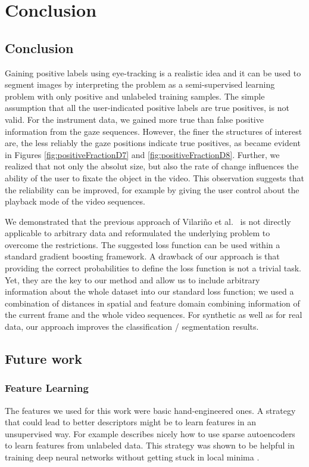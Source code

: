 \chapter{Conclusion}
\label{chap:conclusion}
\section{Conclusion}
Gaining positive labels using eye-tracking is a realistic idea and it can be used to segment images by interpreting the problem as a semi-supervised learning problem with only positive and unlabeled training samples. The simple assumption that all the user-indicated positive labels are true positives, is not valid. For the instrument data, we gained more true than false positive information from the gaze sequences. However, the finer the structures of interest are, the less reliably the gaze positions indicate true positives, as became evident in Figures \ref{fig:positiveFractionD7} and \ref{fig:positiveFractionD8}. Further, we realized that not only the absolut size, but also the rate of change influences the ability of the user to fixate the object in the video. This observation suggests that the reliability can be improved, for example by giving the user control about the playback mode of the video sequences.

We demonstrated that the previous approach of Vilari\~no et al.\ \cite{vilarino2007automatic} is not directly applicable to arbitrary data and reformulated the underlying problem to overcome the restrictions. 
The suggested loss function can be used within a standard gradient boosting framework. 
A drawback of our approach is that providing the correct probabilities to define the loss function is not a trivial task. Yet, they are the key to our method and allow us to include arbitrary information about the whole dataset into our standard loss function; we used a combination of distances in spatial and feature domain combining information of the current frame and the whole video sequences. For synthetic as well as for real data, our approach improves the classification / segmentation results.

\section{Future work}

\subsection{Feature Learning}
The features we used for this work were basic hand-engineered ones. 
A strategy that could lead to better descriptors might be to learn features in an unsupervised way. 
For example \cite{ng2011sparse} describes nicely how to use sparse autoencoders to learn features from unlabeled data. This strategy was shown to be helpful in training deep neural networks without getting stuck in local minima \cite{bengio2007greedy}.

